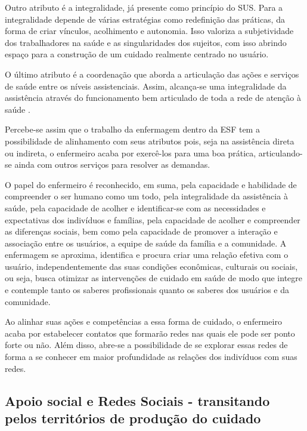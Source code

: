Outro atributo é a integralidade, já presente como princípio do \acrshort{SUS}. Para \cite{oliveira2013atributos} a integralidade depende de várias estratégias como redefinição das práticas, da forma de criar vínculos, acolhimento e autonomia. Isso valoriza a subjetividade dos trabalhadores na saúde e as singularidades dos sujeitos, com isso abrindo espaço para a construção de um cuidado realmente centrado no usuário. 

O último atributo é a coordenação que aborda a articulação das ações e serviços de saúde entre os níveis assistenciais. Assim, alcança-se uma integralidade da assistência através do funcionamento bem articulado de toda a rede de atenção à saúde \cite{oliveira2013atributos}.

Percebe-se assim que o trabalho da enfermagem dentro da \acrshort{ESF} tem a possibilidade de alinhamento com seus atributos pois, seja na assistência direta ou indireta, o enfermeiro acaba por exercê-los para uma boa prática, articulando-se ainda com outros serviços para resolver as demandas.

\begin{citacao}
O papel do enfermeiro é reconhecido, em suma, pela capacidade e habilidade de compreender o ser humano como um todo, pela integralidade da assistência à saúde, pela capacidade de acolher e identificar-se com as necessidades e expectativas dos indivíduos e famílias, pela capacidade de acolher e compreender as diferenças sociais, bem como pela capacidade de promover a interação e associação entre os usuários, a equipe de saúde da família e a comunidade. A enfermagem se aproxima, identifica e procura criar uma relação efetiva com o usuário, independentemente das suas condições econômicas, culturais ou sociais, ou seja, busca otimizar as intervenções de cuidado em saúde de modo que integre e contemple tanto os saberes profissionais quanto os saberes dos usuários e da comunidade. \cite[p. 568]{backes2015significado}
\end{citacao}

Ao alinhar suas ações e competências a essa forma de cuidado, o enfermeiro acaba por estabelecer contatos que formarão redes nas quais ele pode ser ponto forte ou não. Além disso, abre-se a possibilidade de se explorar essas redes de forma a se conhecer em maior profundidade as relações dos indivíduos com suas redes.  

\subsection{Apoio social e Redes Sociais - transitando pelos territórios de produção do cuidado}

